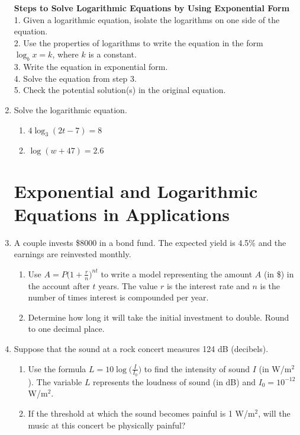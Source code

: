 \documentclass[11pt]{article}
\begin{document}
\begin{enumerate}
\newpage

\noindent \textbf{Steps to Solve Logarithmic Equations by Using Exponential Form}\\
1. Given a logarithmic equation, isolate the logarithms on one side of the equation.\\
2. Use the properties of logarithms to write the equation in the form $\log_b x=k$, where $k$ is a  constant.\\
3. Write the equation in exponential form.\\
4. Solve the equation from step 3.\\
5. Check the potential solution(s) in the original equation.\\



\item Solve the logarithmic equation.
\begin{enumerate}
\item $4\log_3 (2t-7)=8$\vfill
\item $\log(w+47)=2.6$\vfill
\end{enumerate}


\newpage

\section{Exponential and Logarithmic Equations in Applications}


\item A couple invests \$8000 in a bond fund. The expected yield is 4.5\% and the earnings are reinvested monthly.
\begin{enumerate}
\item Use $\displaystyle A=P \Bigg(1+\frac{r}{n}\Bigg)^{nt}$ to write a model representing the amount $A$ (in \$) in the account after $t$ years.  The value $r$ is the interest rate and $n$ is the number of times interest is compounded per year.\\[1in]
\item Determine how long it will take the initial investment to double.  Round to one decimal place.\vfill
\end{enumerate}
\newpage

\item Suppose that the sound at a rock concert measures 124 dB (decibels).
\begin{enumerate}
\item Use the formula $\displaystyle L=10\log \Bigg(\frac{I}{I_0} \Bigg)$ to find the intensity of sound $I$ (in W/m$^2$).  The variable $L$ represents the loudness of sound (in dB) and $I_0=10^{-12}$W/m$^2$.\vfill
\item If the threshold at which the sound becomes painful is 1 W/m$^2$, will the music at this concert be physically painful? \\[1.5in]
\end{enumerate}
\end{enumerate}
\end{document}
